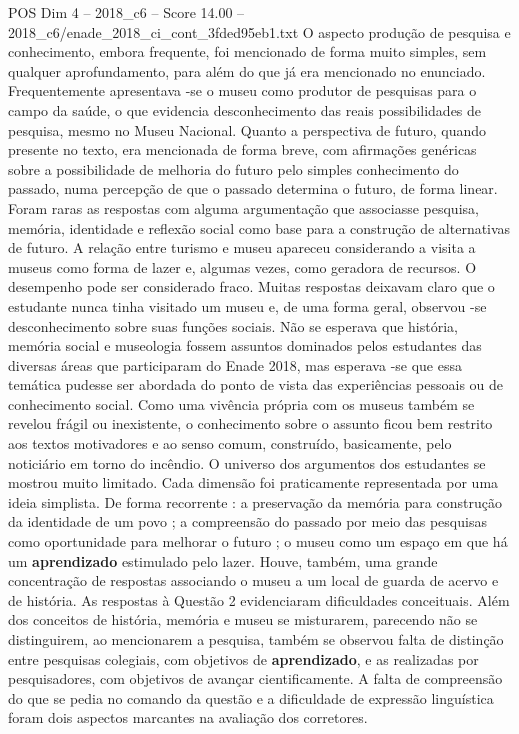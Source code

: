 \begin{textsample}{POS Dim 4 – 2018\_c6 – Score 14.00 – 2018\_c6/enade\_2018\_ci\_cont\_3fded95eb1.txt}
O aspecto produção de pesquisa e conhecimento, embora frequente, foi mencionado de forma muito simples, sem qualquer aprofundamento, para além do que já era mencionado no enunciado.
Frequentemente apresentava -se o museu como produtor de pesquisas para o campo da saúde, o que evidencia desconhecimento das reais possibilidades de pesquisa, mesmo no Museu Nacional.
Quanto a perspectiva de futuro, quando presente no texto, era mencionada de forma breve, com afirmações genéricas sobre a possibilidade de melhoria do futuro pelo simples conhecimento do passado, numa percepção de que o passado determina o futuro, de forma linear.
Foram raras as respostas com alguma argumentação que associasse pesquisa, memória, identidade e reflexão social como base para a construção de alternativas de futuro.
A relação entre turismo e museu apareceu considerando a visita a museus como forma de lazer e, algumas vezes, como geradora de recursos.
O desempenho pode ser considerado fraco.
Muitas respostas deixavam claro que o estudante nunca tinha visitado um museu e, de uma forma geral, observou -se desconhecimento sobre suas funções sociais.
Não se esperava que história, memória social e museologia fossem assuntos dominados pelos estudantes das diversas áreas que participaram do Enade 2018, mas esperava -se que essa temática pudesse ser abordada do ponto de vista das experiências pessoais ou de conhecimento social.
Como uma vivência própria com os museus também se revelou frágil ou inexistente, o conhecimento sobre o assunto ficou bem restrito aos textos motivadores e ao senso comum, construído, basicamente, pelo noticiário em torno do incêndio.
O universo dos argumentos dos estudantes se mostrou muito limitado.
Cada dimensão foi praticamente representada por uma ideia simplista.
De forma recorrente : a preservação da memória para construção da identidade de um povo ; a compreensão do passado por meio das pesquisas como oportunidade para melhorar o futuro ; o museu como um espaço em que há um \textbf{aprendizado} estimulado pelo lazer.
Houve, também, uma grande concentração de respostas associando o museu a um local de guarda de acervo e de história.
As respostas à Questão 2 evidenciaram dificuldades conceituais.
Além dos conceitos de história, memória e museu se misturarem, parecendo não se distinguirem, ao mencionarem a pesquisa, também se observou falta de distinção entre pesquisas colegiais, com objetivos de \textbf{aprendizado}, e as realizadas por pesquisadores, com objetivos de avançar cientificamente.
A falta de compreensão do que se pedia no comando da questão e a dificuldade de expressão linguística foram dois aspectos marcantes na avaliação dos corretores.

\end{textsample}
